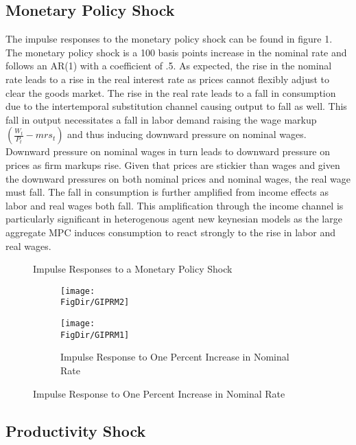 \documentclass[titlepage]{\econtex}\providecommand{\texname}{BufferStockTheory}
\providecommand{\FigDir}{Figures}
\begin{document}
\hypertarget{Monetary Policy Shock}{}
\subsection{Monetary Policy Shock}

The impulse responses to the monetary policy shock can be found in figure 1. The monetary policy shock is a 100 basis points increase in the nominal rate and follows an AR(1) with a coefficient of .5.  As expected, the rise in the nominal rate leads to a rise in the real interest rate as prices cannot flexibly adjust to clear the goods market. The rise in the real rate leads to a fall in consumption due to the intertemporal substitution channel  causing output to fall as well. This fall in output necessitates a fall in labor demand raising the wage markup $(\frac{W_{t}}{P_{t}} - mrs_{t})$ and thus inducing downward pressure on nominal wages. Downward pressure on nominal wages in turn leads to downward pressure on prices as firm markups rise. Given that prices are stickier than wages and given the downward pressures on both nominal prices and nominal wages, the real wage must fall. The fall in consumption is further amplified from income effects as labor and real wages both fall.  This amplification through the income channel is particularly significant in heterogenous agent new keynesian models as the large aggregate MPC induces consumption to react strongly to the rise in labor and real wages. 


\begin{figure}{Impulse Responses to a Monetary Policy Shock}
  \begin{subfigure}{}
    \centering\texttt{[image: \\FigDir/GIPRM2]}
  \end{subfigure}
  \begin{subfigure}{}
    \centering\texttt{[image: \\FigDir/GIPRM1]}
    \caption{ Impulse Response to One Percent Increase in Nominal Rate}
  \end{subfigure}
\end{figure}


\hypertarget{Productivity Shock}{}
\subsection{Productivity Shock}
\end{document}
